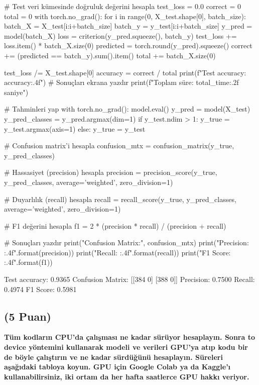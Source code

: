 \documentclass[11pt]{article}
\begin{document}
\begin{python}

# Test veri kümesinde doğruluk değerini hesapla
test_loss = 0.0
correct = 0
total = 0
with torch.no_grad():
    for i in range(0, X_test.shape[0], batch_size):
        batch_X = X_test[i:i+batch_size]
        batch_y = y_test[i:i+batch_size]
        y_pred = model(batch_X)
        loss = criterion(y_pred.squeeze(), batch_y)
        test_loss += loss.item() * batch_X.size(0)
        predicted = torch.round(y_pred).squeeze()
        correct += (predicted == batch_y).sum().item()
        total += batch_X.size(0)

test_loss /= X_test.shape[0]
accuracy = correct / total
print(f"Test accuracy: {accuracy:.4f}")
# Sonuçları ekrana yazdır
print(f"Toplam süre: {total_time:.2f} saniye")

# Tahminleri yap
with torch.no_grad():
    model.eval()
    y_pred = model(X_test)
    y_pred_classes = y_pred.argmax(dim=1)
    if y_test.ndim > 1:
        y_true = y_test.argmax(axis=1)
    else:
        y_true = y_test

# Confusion matrix'i hesapla
confusion_mtx = confusion_matrix(y_true, y_pred_classes)

# Hassasiyet (precision) hesapla
precision = precision_score(y_true, y_pred_classes, average='weighted', zero_division=1)

# Duyarlılık (recall) hesapla
recall = recall_score(y_true, y_pred_classes, average='weighted', zero_division=1)

# F1 değerini hesapla
f1 = 2 * (precision * recall) / (precision + recall)

# Sonuçları yazdır
print("Confusion Matrix:\n", confusion_mtx)
print("Precision: {:.4f}".format(precision))
print("Recall: {:.4f}".format(recall))
print("F1 Score: {:.4f}".format(f1))

\end{python}

Test accuracy: 0.9365
Confusion Matrix:
 [[384   0]
 [388   0]]
Precision: 0.7500
Recall: 0.4974
F1 Score: 0.5981

\subsection{(5 Puan)} \textbf{Tüm kodların CPU'da çalışması ne kadar sürüyor hesaplayın. Sonra to device yöntemini kullanarak modeli ve verileri GPU'ya atıp kodu bir de böyle çalıştırın ve ne kadar sürdüğünü hesaplayın. Süreleri aşağıdaki tabloya koyun. GPU için Google Colab ya da Kaggle'ı kullanabilirsiniz, iki ortam da her hafta saatlerce GPU hakkı veriyor.}
\end{document}

